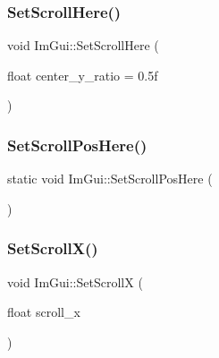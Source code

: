 \hypertarget{namespace_im_gui_aa60ea4a42b8d03d27431f8e79b9f0254}{}\label{namespace_im_gui_aa60ea4a42b8d03d27431f8e79b9f0254} 
\subsubsection{\texorpdfstring{Set\+Scroll\+Here()}{SetScrollHere()}}
{\footnotesize\ttfamily void Im\+Gui\+::\+Set\+Scroll\+Here (\begin{DoxyParamCaption}\item[{float}]{center\+\_\+y\+\_\+ratio = {\ttfamily 0.5f} }\end{DoxyParamCaption})}

\hypertarget{namespace_im_gui_a7cc7b1f2269550cfce93625243531ff3}{}\label{namespace_im_gui_a7cc7b1f2269550cfce93625243531ff3} 
\subsubsection{\texorpdfstring{Set\+Scroll\+Pos\+Here()}{SetScrollPosHere()}}
{\footnotesize\ttfamily static void Im\+Gui\+::\+Set\+Scroll\+Pos\+Here (\begin{DoxyParamCaption}{ }\end{DoxyParamCaption})\hspace{0.3cm}{\ttfamily [static]}}

\hypertarget{namespace_im_gui_a0796750de8c50555d895f63e79ac87f0}{}\label{namespace_im_gui_a0796750de8c50555d895f63e79ac87f0} 
\subsubsection{\texorpdfstring{Set\+Scroll\+X()}{SetScrollX()}}
{\footnotesize\ttfamily void Im\+Gui\+::\+Set\+ScrollX (\begin{DoxyParamCaption}\item[{float}]{scroll\+\_\+x }\end{DoxyParamCaption})}

\hypertarget{namespace_im_gui_a41833555962807384432e6fc94d46ec9}{}\label{namespace_im_gui_a41833555962807384432e6fc94d46ec9} 
